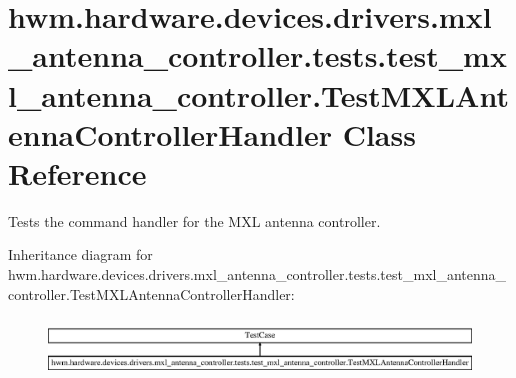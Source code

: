 \hypertarget{classhwm_1_1hardware_1_1devices_1_1drivers_1_1mxl__antenna__controller_1_1tests_1_1test__mxl__anf1b82778ca0869b41ace53be3d0454a2}{\section{hwm.\-hardware.\-devices.\-drivers.\-mxl\-\_\-antenna\-\_\-controller.\-tests.\-test\-\_\-mxl\-\_\-antenna\-\_\-controller.\-Test\-M\-X\-L\-Antenna\-Controller\-Handler Class Reference}
\label{classhwm_1_1hardware_1_1devices_1_1drivers_1_1mxl__antenna__controller_1_1tests_1_1test__mxl__anf1b82778ca0869b41ace53be3d0454a2}
}


Tests the command handler for the M\-X\-L antenna controller.  


Inheritance diagram for hwm.\-hardware.\-devices.\-drivers.\-mxl\-\_\-antenna\-\_\-controller.\-tests.\-test\-\_\-mxl\-\_\-antenna\-\_\-controller.\-Test\-M\-X\-L\-Antenna\-Controller\-Handler\-:\begin{figure}[H]
\begin{center}
\leavevmode
\includegraphics[height=1.551247cm]{classhwm_1_1hardware_1_1devices_1_1drivers_1_1mxl__antenna__controller_1_1tests_1_1test__mxl__anf1b82778ca0869b41ace53be3d0454a2}
\end{center}
\end{figure}
